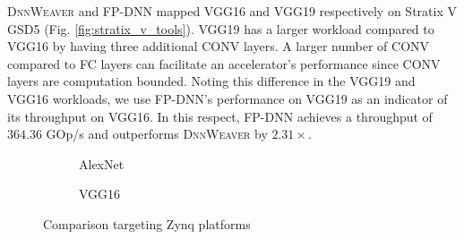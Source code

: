 \documentclass[format=acmsmall, review=false, screen=true]{acmart}
\begin{document}
\textsc{DnnWeaver} and FP-DNN mapped VGG16 and VGG19 respectively on Stratix V GSD5 (Fig. \ref{fig:stratix_v_tools}). 
VGG19 has a larger workload compared to VGG16 by having three additional CONV layers. %
A larger number of CONV compared to FC layers can facilitate an accelerator's performance since CONV layers are computation bounded. Noting this difference in the VGG19 and VGG16 workloads, we use \mbox{FP-DNN's} performance on VGG19 as an indicator of its throughput on VGG16. In this respect, FP-DNN achieves a throughput of $364.36$ GOp/s and outperforms \textsc{DnnWeaver} by $2.31 \times$. 


\begin{figure}
	\centering
	\begin{subfigure}{.48\linewidth}
			\vspace{-0.6cm}
			\caption{AlexNet}
			\label{fig:alexnet_tools}
	\end{subfigure}
	\begin{subfigure}{.48\linewidth}
		\vspace{-0.5cm}
		\caption{VGG16}
		\label{fig:vgg16_tools}
	\end{subfigure}
	\vspace{-0.4cm}
	\caption{Comparison targeting Zynq platforms} %
	\label{fig:zynq_comp}
	\vspace{-0.55cm}
\end{figure}
\end{document}
